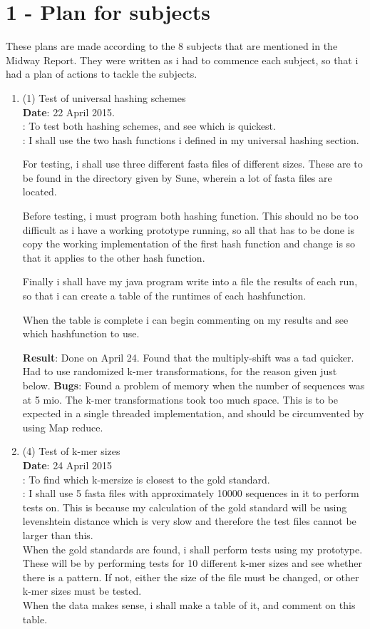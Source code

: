 \documentclass[../../main.tex]{subfiles}
\begin{document}
\section*{1 - Plan for subjects}
These plans are made according to the 8 subjects that are mentioned in the Midway Report. They were written as i had to commence each subject, so that i had a plan of actions to tackle the subjects.
\begin{enumerate}
\item (1) Test of universal hashing schemes\\
{\bf Date}: 22 April 2015.\\
: To test both hashing schemes, and see which is quickest.\\
: I shall use the two hash functions i defined in my universal hashing section.

For testing, i shall use three different fasta files of different sizes. These are to be found in the directory given by Sune, wherein a lot of fasta files are located. 

Before testing, i must program both hashing function. This should no be too difficult as i have a working prototype running, so all that has to be done is copy the working implementation of the first hash function and change is so that it applies to the other hash function. 

Finally i shall have my java program write into a file the results of each run, so that i can create a table of the runtimes of each hashfunction. 

When the table is complete i can begin commenting on my results and see which hashfunction to use.


{\bf Result}: Done on April 24. Found that the multiply-shift was a tad quicker. Had to use randomized k-mer transformations, for the reason given just below.
{\bf Bugs}: Found a problem of memory when the number of sequences was at 5 mio. The k-mer transformations took too much space. This is to be expected in a single threaded implementation, and should be circumvented by using Map reduce. 

\item (4) Test of k-mer sizes\\
{\bf Date}: 24 April 2015\\
: To find which k-mersize is closest to the gold standard.\\
: I shall use 5 fasta files with approximately 10000 sequences in it to perform tests on. This is because my calculation of the gold standard will be using levenshtein distance which is very slow and therefore the test files cannot be larger than this.\\

When the gold standards are found, i shall perform tests using my prototype. These will be by performing tests for 10 different k-mer sizes and see whether there is a pattern. If not, either the size of the file must be changed, or other k-mer sizes must be tested.\\

When the data makes sense, i shall make a table of it, and comment on this table.
\end{enumerate}
\end{document}
